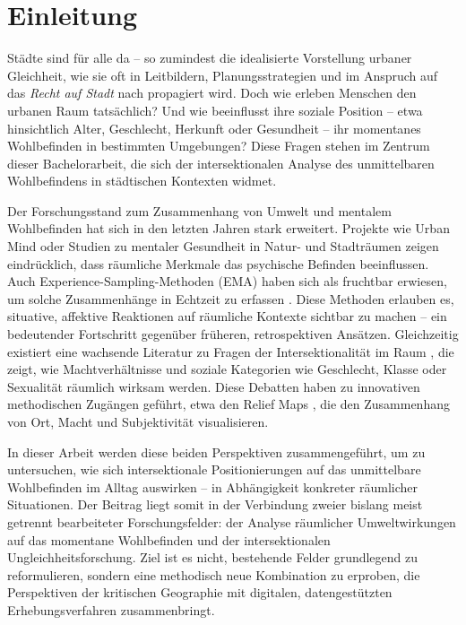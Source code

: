 \section{Einleitung}

\glqq Städte sind für alle da\grqq{} – so zumindest die idealisierte Vorstellung urbaner Gleichheit, wie sie oft in Leitbildern, Planungsstrategien und im Anspruch auf das \emph{Recht auf Stadt} nach \textcite{lefebvreDroitVille1967} propagiert wird. Doch wie erleben Menschen den urbanen Raum tatsächlich? Und wie beeinflusst ihre soziale Position – etwa hinsichtlich Alter, Geschlecht, Herkunft oder Gesundheit – ihr momentanes Wohlbefinden in bestimmten Umgebungen? Diese Fragen stehen im Zentrum dieser Bachelorarbeit, die sich der intersektionalen Analyse des unmittelbaren Wohlbefindens in städtischen Kontexten widmet.

Der Forschungsstand zum Zusammenhang von Umwelt und mentalem Wohlbefinden hat sich in den letzten Jahren stark erweitert. Projekte wie Urban Mind \parencite{bakolisUrbanMindUsing2018} oder Studien zu mentaler Gesundheit in Natur- und Stadträumen \parencite{bergouMentalHealthBenefits2022} zeigen eindrücklich, dass räumliche Merkmale das psychische Befinden beeinflussen. Auch Experience-Sampling-Methoden (EMA) haben sich als fruchtbar erwiesen, um solche Zusammenhänge in Echtzeit zu erfassen \parencite{shiffmanEcologicalMomentaryAssessment2008, stoneEcologicalMomentaryAssessment1994, kirchnerSpatiotemporalDeterminantsMental2016}. Diese Methoden erlauben es, situative, affektive Reaktionen auf räumliche Kontexte sichtbar zu machen – ein bedeutender Fortschritt gegenüber früheren, retrospektiven Ansätzen. Gleichzeitig existiert eine wachsende Literatur zu Fragen der Intersektionalität im Raum \parencite{crenshawMappingMarginsIntersectionality1991, rodo-de-zarateDevelopingGeographiesIntersectionality2014, rodo-de-zarateIntersectionalityFeministGeographies2018, rodo-de-zarateYoungLesbiansNegotiating2015}, die zeigt, wie Machtverhältnisse und soziale Kategorien wie Geschlecht, Klasse oder Sexualität räumlich wirksam werden. Diese Debatten haben zu innovativen methodischen Zugängen geführt, etwa den Relief Maps \parencite{rodo-de-zarateDevelopingGeographiesIntersectionality2014}, die den Zusammenhang von Ort, Macht und Subjektivität visualisieren.

In dieser Arbeit werden diese beiden Perspektiven zusammengeführt, um zu untersuchen, wie sich intersektionale Positionierungen auf das unmittelbare Wohlbefinden im Alltag auswirken – in Abhängigkeit konkreter räumlicher Situationen. Der Beitrag liegt somit in der Verbindung zweier bislang meist getrennt bearbeiteter Forschungsfelder: der Analyse räumlicher Umweltwirkungen auf das momentane Wohlbefinden und der intersektionalen Ungleichheitsforschung. Ziel ist es nicht, bestehende Felder grundlegend zu reformulieren, sondern eine methodisch neue Kombination zu erproben, die Perspektiven der kritischen Geographie mit digitalen, datengestützten Erhebungsverfahren zusammenbringt.


